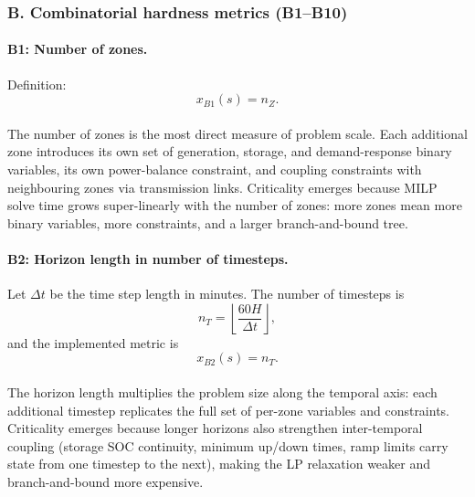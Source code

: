 \documentclass{article}
\begin{document}

\subsubsection*{B. Combinatorial hardness metrics (B1--B10)}

\paragraph{B1: Number of zones.}
Definition:
\begin{equation}
x_{B1}(s)=n_Z.
\end{equation}

\paragraph{}The number of zones is the most direct measure of problem scale. Each additional zone introduces its own set of generation, storage, and demand-response binary variables, its own power-balance constraint, and coupling constraints with neighbouring zones via transmission links. Criticality emerges because MILP solve time grows super-linearly with the number of zones: more zones mean more binary variables, more constraints, and a larger branch-and-bound tree.

\paragraph{B2: Horizon length in number of timesteps.}
Let $\Delta t$ be the time step length in minutes. The number of timesteps is
\begin{equation}
n_T=\left\lfloor \frac{60H}{\Delta t}\right\rfloor,
\end{equation}
and the implemented metric is
\begin{equation}
x_{B2}(s)=n_T.
\end{equation}

\paragraph{}The horizon length multiplies the problem size along the temporal axis: each additional timestep replicates the full set of per-zone variables and constraints. Criticality emerges because longer horizons also strengthen inter-temporal coupling (storage SOC continuity, minimum up/down times, ramp limits carry state from one timestep to the next), making the LP relaxation weaker and branch-and-bound more expensive.
\end{document}
